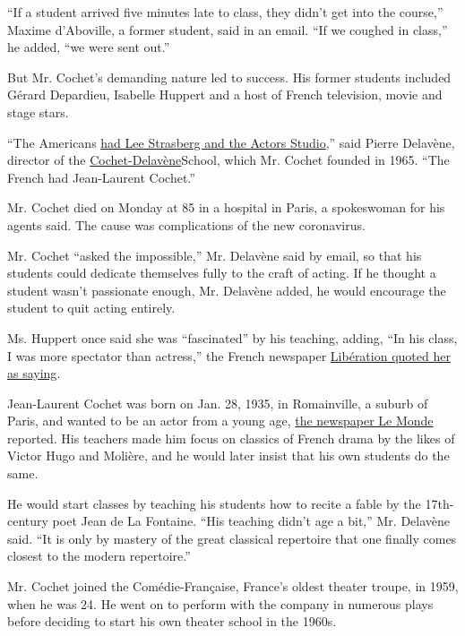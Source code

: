 ``If a student arrived five minutes late to class, they didn't get into
the course,'' Maxime d'Aboville, a former student, said in an email.
``If we coughed in class,'' he added, ``we were sent out.''

But Mr. Cochet's demanding nature led to success. His former students
included Gérard Depardieu, Isabelle Huppert and a host of French
television, movie and stage stars.

``The Americans
\href{https://www.nytimes3xbfgragh.onion/1982/02/18/obituaries/lee-strasberg-of-actors-studio-dead.html}{had
Lee Strasberg and the Actors Studio},'' said Pierre Delavène, director
of the
\href{https://www.courscochetdelavene.fr/}{Cochet-Delavène}School, which
Mr. Cochet founded in 1965. ``The French had Jean-Laurent Cochet.''

Mr. Cochet died on Monday at 85 in a hospital in Paris, a spokeswoman
for his agents said. The cause was complications of the new coronavirus.

Mr. Cochet ``asked the impossible,'' Mr. Delavène said by email, so that
his students could dedicate themselves fully to the craft of acting. If
he thought a student wasn't passionate enough, Mr. Delavène added, he
would encourage the student to quit acting entirely.

Ms. Huppert once said she was ``fascinated'' by his teaching, adding,
``In his class, I was more spectator than actress,'' the French
newspaper
\href{https://next.liberation.fr/culture/2020/04/07/mort-de-jean-laurent-cochet-maitre-des-acteurs-francais_1784481}{Libération
quoted her as saying}.

Jean-Laurent Cochet was born on Jan. 28, 1935, in Romainville, a suburb
of Paris, and wanted to be an actor from a young age,
\href{https://www.lemonde.fr/disparitions/article/2020/04/07/le-metteur-en-scene-jean-laurent-cochet-est-mort_6035879_3382.html}{the
newspaper Le Monde} reported. His teachers made him focus on classics of
French drama by the likes of Victor Hugo and Molière, and he would later
insist that his own students do the same.

He would start classes by teaching his students how to recite a fable by
the 17th-century poet Jean de La Fontaine. ``His teaching didn't age a
bit,'' Mr. Delavène said. ``It is only by mastery of the great classical
repertoire that one finally comes closest to the modern repertoire.''

Mr. Cochet joined the Comédie-Française, France's oldest theater troupe,
in 1959, when he was 24. He went on to perform with the company in
numerous plays before deciding to start his own theater school in the
1960s.

